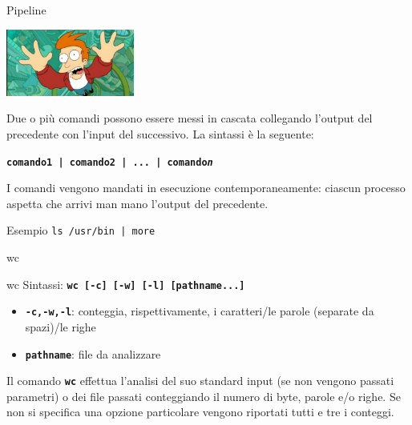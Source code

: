 \documentclass{beamer}
\begin{document}
    \begin{frame}{Pipeline}
        \begin{center}
            \includegraphics[height=2.2cm,keepaspectratio]{images/futurama.png}
        \end{center}
        Due o più comandi possono essere messi in cascata collegando l'output
        del precedente con l'input del successivo. La sintassi è la seguente: 
        
        \begin{center}
            \texttt{\textbf{comando1 | comando2 | ... | comando\textit{n}}}
        \end{center}

        I comandi vengono mandati in esecuzione contemporaneamente: ciascun processo aspetta che arrivi man mano l’output del precedente.

        \begin{exampleblock}{Esempio}
            \texttt{ls /usr/bin | more }
        \end{exampleblock}
    \end{frame}

    \begin{frame}{wc}
        \begin{block}{wc}
            \small
            Sintassi: \texttt{\textbf{wc [-c] [-w] [-l] [pathname...]}}

            \begin{itemize}
                \item \texttt{\textbf{-c,-w,-l}}: conteggia, rispettivamente, i caratteri/le parole (separate da spazi)/le righe
                \item \texttt{\textbf{pathname}}: file da analizzare
            \end{itemize}

            Il comando \texttt{\textbf{wc}} effettua l’analisi del suo standard input (se non vengono
            passati parametri) o dei file passati conteggiando il numero di byte, parole
            e/o righe. Se non si specifica una opzione particolare vengono riportati
            tutti e tre i conteggi.
        \end{block}
    \end{frame}
\end{document}
